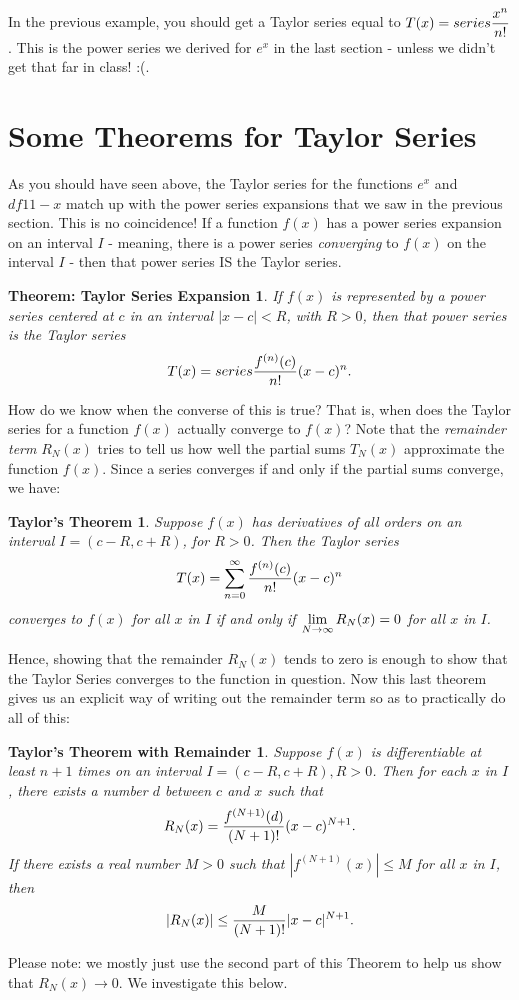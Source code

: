 \documentclass{ximera}
\newcommand{\dsum}{\displaystyle \sum}
\newcommand{\dseries}{\dsum_{n=0}^{\infty}}
\newtheorem*{TaylorExpansion}{Theorem: Taylor Series Expansion}
\newtheorem*{TaylorsThm}{Taylor's Theorem}
\newtheorem*{RemainderThm}{Taylor's Theorem with Remainder}
\begin{document}
In the previous example, you should get a Taylor series equal to $T(x) = series \displaystyle\frac{x^n}{n!}$. This is the power series we derived for $e^x$ in the last section - unless we didn't get that far in class! :(.


\section*{Some Theorems for Taylor Series}

As you should have seen above, the Taylor series for the functions $e^x$ and $df{1}{1-x}$ match up with the power series expansions that we saw in the previous section. This is no coincidence! If a function $f(x)$ has a power series expansion on an interval $I$ - meaning, there is a power series \emph{converging} to $f(x)$ on the interval $I$ - then that power series IS the Taylor series.

	\begin{TaylorExpansion}
		If $f(x)$ is represented by a power series centered at $c$ in an interval $|x-c| < R$, with $R>0$, then that power series is the Taylor series
		\[
			T(x) = series \displaystyle\frac{f^{(n)}(c)}{n!}(x-c)^n.
		\]
	\end{TaylorExpansion}

How do we know when the converse of this is true? That is, when does the Taylor series for a function $f(x)$ actually converge to $f(x)$? Note that the \emph{remainder term} $R_N(x)$ tries to tell us how well the partial sums $T_N(x)$ approximate the function $f(x)$. Since a series converges if and only if the partial sums converge, we have:

	\begin{TaylorsThm}
		Suppose $f(x)$ has derivatives of all orders on an interval $I = (c-R, c+R)$, for $R>0$. Then the Taylor series
		\[
			T(x) = \dseries \df{f^{(n)}(c)}{n!}(x-c)^n
		\] 
		converges to $f(x)$ for all $x$ in $I$ if and only if $\displaystyle \lim_{N \to \infty} R_N(x) = 0$ for all $x$ in $I$.
	\end{TaylorsThm}

Hence, showing that the remainder $R_N(x)$ tends to zero is enough to show that the Taylor Series converges to the function in question. Now this last theorem gives us an explicit way of writing out the remainder term so as to practically do all of this:

	\begin{RemainderThm}
		Suppose $f(x)$ is differentiable at least $n+1$ times on an interval $I=(c-R, c+R), R>0$. Then for each $x$ in $I$, there exists a number $d$ between $c$ and $x$ such that
		\[
			R_N(x) =  \displaystyle\frac{f^{(N+1)}(d)}{(N+1)!}(x-c)^{N+1}.
		\]
	If there exists a real number $M>0$ such that $|f^{(N+1)}(x)| \leq M$ for all $x$ in $I$, then
		\[
			|R_N(x)| \leq \displaystyle\frac{M}{(N+1)!}|x-c|^{N+1}.
		\]
	\end{RemainderThm}
Please note: we mostly just use the second part of this Theorem to help us show that $R_N(x) \to 0$. We investigate this below.	
	
\end{document}
